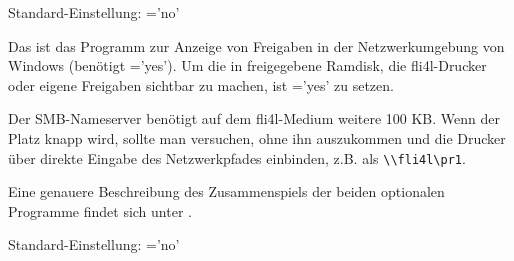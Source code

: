     Standard-Einstellung: ='no'



    Das ist das Programm zur Anzeige von Freigaben in der Netzwerkumgebung von
    Windows (benötigt ='yes'). Um die in 
    freigegebene Ramdisk, die fli4l-Drucker oder eigene Freigaben sichtbar zu
    machen, ist ='yes' zu setzen.

    Der SMB-Nameserver benötigt auf dem fli4l-Medium weitere 100 KB. Wenn der
    Platz knapp wird, sollte man versuchen, ohne ihn
    auszukommen und die Drucker über direkte Eingabe des Netzwerkpfades
    einbinden, z.B. als \verb+\\fli4l\pr1+.

    Eine genauere Beschreibung des Zusammenspiels der beiden optionalen
    Programme findet sich unter .

    Standard-Einstellung: ='no'



